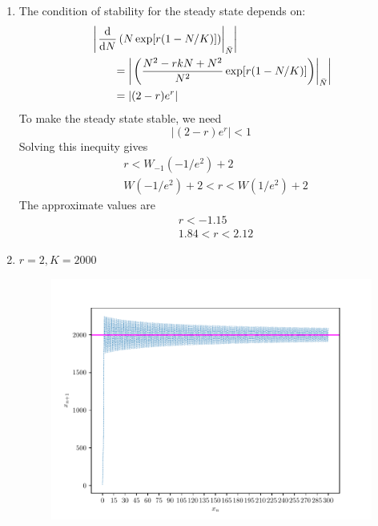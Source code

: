 \begin{homeworkProblem}[4]
\begin{enumerate}
\item The condition of stability for the steady state depends on: \[
    \begin{aligned}
        &\left|\left.\derivlong[N]{N\exp[r(1-N/K)]}\right|_{\bar N}\right|\\
        &\qquad = \left| \left.\left(
            \frac{N^2 -rkN + N^2}{N^2} \exp[r(1-N/K)]
        \right)\right|_{\bar N} \right|\\
        &\qquad = |(2-r)e^r|
    \end{aligned}
\]
To make the steady state stable, we need \[
    |
    (2-r)e^r| < 1
\]
Solving this inequity gives \[
    \begin{aligned}
        &r < W_{-1}(-1/e^2) + 2\\
        &W(-1/e^2) + 2 < r < W(1/e^2) + 2
    \end{aligned}
\]
The approximate values are \[
    \begin{aligned}
        &r < -1.15\\
        &1.84 < r < 2.12
    \end{aligned}
\]
\pagebreak
\item $r = 2, K = 2000$
\begin{figure}[h]
    \centering
    \includegraphics[scale=0.6]{../fig/fig4(d).pdf}
\end{figure}
\end{enumerate}
\end{homeworkProblem}